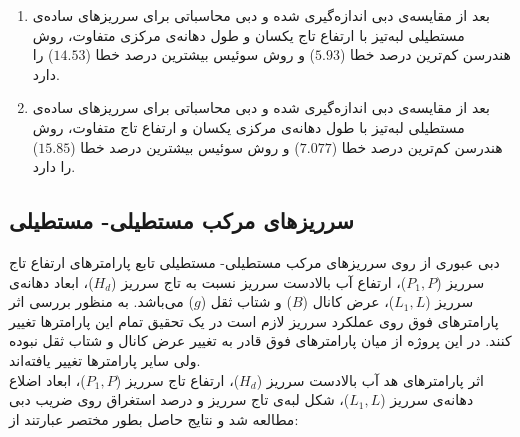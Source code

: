 \begin{enumerate}
\item  
	بعد از مقایسه‌ی دبی اندازه‌گیری شده و دبی محاسباتی برای سرریزهای ساده‌ی مستطیلی لبه‌تیز با ارتفاع تاج یکسان و طول دهانه‌ی مرکزی متفاوت، روش هندرسن کم‌ترین درصد خطا ($5.93$) و روش سوئیس بیشترین درصد خطا ($14.53$) را دارد.
\item 
	بعد از مقایسه‌ی دبی اندازه‌گیری شده و دبی محاسباتی برای سرریزهای ساده‌ی مستطیلی لبه‌تیز با طول دهانه‌ی مرکزی یکسان و ارتفاع تاج  متفاوت، روش هندرسن کم‌ترین درصد خطا ($7.077$) و روش سوئیس بیشترین درصد خطا ($15.85$) را دارد.
\end{enumerate}
\subsection{سرریزهای مرکب مستطیلی- مستطیلی}
دبی عبوری از روی سرریزهای مرکب مستطیلی- مستطیلی تابع پارامترهای ارتفاع تاج سرریز ($P_1,P$)، ارتفاع آب بالادست سرریز نسبت به تاج سرریز ($H_d$)، ابعاد دهانه‌ی سرریز ($L_1,L$)،  عرض کانال ($B$) و شتاب ثقل ($g$) می‌باشد. به منظور بررسی اثر پارامترهای فوق روی عملکرد سرریز لازم است در یک تحقیق تمام این پارامترها تغییر کنند. در این پروژه از میان پارامترهای فوق قادر به تغییر عرض کانال و شتاب ثقل نبوده ولی سایر پارامترها تغییر یافته‌اند.\\
اثر پارامترهای هد آب بالادست سرریز ($H_d$)، ارتفاع تاج سرریز ($P_1,P$)،   ابعاد اضلاع دهانه‌ی سرریز ($L_1,L$)، شکل لبه‌ی تاج سرریز و درصد استغراق روی ضریب دبی مطالعه شد و نتایج حاصل بطور مختصر عبارتند از:

